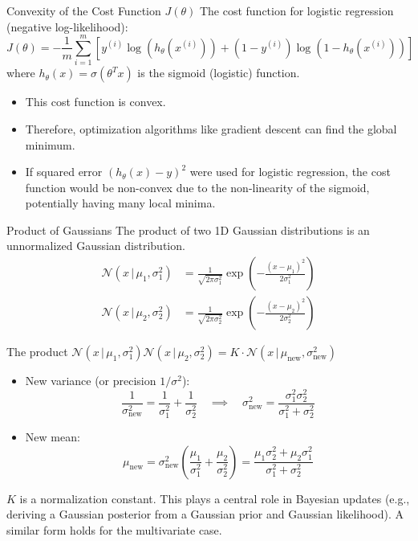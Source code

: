 \documentclass{beamer} %
\newcommand{\given}{\,|\,}
\begin{document}
\begin{frame}{Convexity of the Cost Function $J(\theta)$}
  The cost function for logistic regression (negative log-likelihood):
  \begin{equation*}
    J(\theta) = -\frac{1}{m} \sum_{i=1}^m [y^{(i)}\log(h_\theta(x^{(i)})) + (1-y^{(i)})\log(1-h_\theta(x^{(i)}))]
  \end{equation*}
  where $h_\theta(x) = \sigma(\theta^T x)$ is the sigmoid (logistic) function.
  \begin{itemize}
    \item This cost function is convex.
    \item Therefore, optimization algorithms like gradient descent can find the global minimum.
    \item If squared error $(h_\theta(x) - y)^2$ were used for logistic regression, the cost function would be non-convex due to the non-linearity of the sigmoid, potentially having many local minima.
  \end{itemize}
\end{frame}

\begin{frame}{Product of Gaussians}
  The product of two 1D Gaussian distributions is an unnormalized Gaussian distribution.
  \begin{align*}
    \mathcal{N}(x \given \mu_1, \sigma_1^2) &= \frac{1}{\sqrt{2\pi\sigma_1^2}} \exp\left(-\frac{(x-\mu_1)^2}{2\sigma_1^2}\right) \\
    \mathcal{N}(x \given \mu_2, \sigma_2^2) &= \frac{1}{\sqrt{2\pi\sigma_2^2}} \exp\left(-\frac{(x-\mu_2)^2}{2\sigma_2^2}\right)
  \end{align*}
  \begin{prop}
  The product $\mathcal{N}(x \given \mu_1, \sigma_1^2) \mathcal{N}(x \given \mu_2, \sigma_2^2) = K \cdot \mathcal{N}(x \given \mu_{\text{new}}, \sigma_{\text{new}}^2)$
  \begin{itemize}
    \item New variance (or precision $1/\sigma^2$):
      \begin{equation*}
        \frac{1}{\sigma_{\text{new}}^2} = \frac{1}{\sigma_1^2} + \frac{1}{\sigma_2^2} \quad \implies \quad \sigma_{\text{new}}^2 = \frac{\sigma_1^2 \sigma_2^2}{\sigma_1^2 + \sigma_2^2}
      \end{equation*}
    \item New mean:
      \begin{equation*}
      \mu_{\text{new}} = \sigma_{\text{new}}^2 \left(\frac{\mu_1}{\sigma_1^2} + \frac{\mu_2}{\sigma_2^2}\right) = \frac{\mu_1\sigma_2^2 + \mu_2\sigma_1^2}{\sigma_1^2 + \sigma_2^2}
      \end{equation*}
  \end{itemize}
  \end{prop}
  $K$ is a normalization constant. This plays a central role in Bayesian updates (e.g., deriving a Gaussian posterior from a Gaussian prior and Gaussian likelihood). A similar form holds for the multivariate case.
\end{frame}
\end{document}
